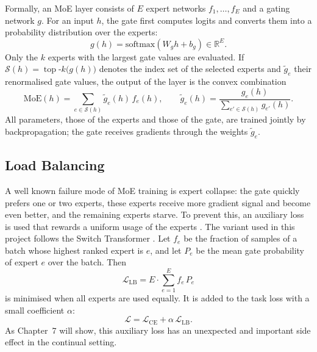 Formally, an MoE layer consists of $E$ expert networks $f_1, \dots, f_E$
and a gating network $g$. For an input $h$, the gate first computes logits
and converts them into a probability distribution over the experts:
\begin{equation}
  g(h) = \mathrm{softmax}\!\left(W_g h + b_g\right) \in \mathbb{R}^{E}.
  \label{eq:gate}
\end{equation}
Only the $k$ experts with the largest gate values are evaluated. If
$\mathcal{S}(h) = \operatorname{top}\text{-}k\big(g(h)\big)$ denotes the
index set of the selected experts and $\tilde{g}_e$ their renormalised gate
values, the output of the layer is the convex combination
\begin{equation}
  \mathrm{MoE}(h) = \sum_{e \in \mathcal{S}(h)} \tilde{g}_e(h) \, f_e(h),
  \qquad
  \tilde{g}_e(h) = \frac{g_e(h)}{\sum_{e' \in \mathcal{S}(h)} g_{e'}(h)}.
  \label{eq:moe}
\end{equation}
All parameters, those of the experts and those of the gate, are trained
jointly by backpropagation; the gate receives gradients through the weights
$\tilde{g}_e$.

\subsection{Load Balancing}
\label{sec:loadbalance}

A well known failure mode of MoE training is expert collapse: the gate
quickly prefers one or two experts, these experts receive more gradient
signal and become even better, and the remaining experts starve. To prevent
this, an auxiliary loss is used that rewards a uniform usage of the experts
\cite{shazeer2017}. The variant used in this project follows the Switch
Transformer \cite{fedus2022}. Let $f_e$ be the fraction of samples of a
batch whose highest ranked expert is $e$, and let $P_e$ be the mean gate
probability of expert $e$ over the batch. Then
\begin{equation}
  \mathcal{L}_{\mathrm{LB}} = E \cdot \sum_{e=1}^{E} f_e \, P_e
  \label{eq:lb}
\end{equation}
is minimised when all experts are used equally. It is added to the task
loss with a small coefficient $\alpha$:
\begin{equation}
  \mathcal{L} = \mathcal{L}_{\mathrm{CE}} + \alpha \, \mathcal{L}_{\mathrm{LB}}.
  \label{eq:totalloss}
\end{equation}
As Chapter~7 will show, this auxiliary loss has an unexpected and important
side effect in the continual setting.

